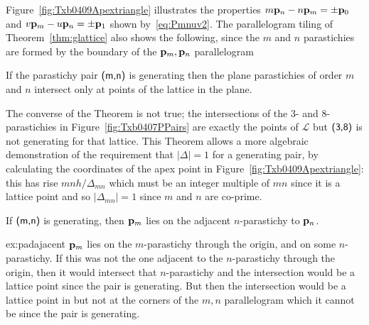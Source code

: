 Figure~\ref{fig:Txb0409Apextriangle} illustrates the properties $m{\mathbf p}_{n}-n{\mathbf p}_{m}=\pm{\mathbf p}_{0}$ and $v{\mathbf p}_{m}-u{\mathbf p}_{n}=\pm{\mathbf p}_{1}$ shown by~\eqref{eq:Pmnuv2}.
%
%
%
The parallelogram tiling of Theorem~\ref{thm:glattice} also shows the following, since the $m$ and $n$ parastichies are formed by the boundary of the ${\mathbf p}_{m},{\mathbf p}_{n}$ parallelogram
\begin{theorem}
	\label{thm:planeintersect}
	If the parastichy pair $\textsf{(m,n)}$ is generating then the plane parastichies of order $m$ and $n$ intersect only at points of the lattice in the plane.
\end{theorem}
The converse of the Theorem is not true; the intersections of the 3- and 8-parastichies in  Figure~\ref{fig:Txb0407PPairs} are exactly the points of $\mathcal{L}$ but $\textsf{(3,8)}$ is not generating for that lattice. 
This Theorem allows a more algebraic demonstration of the requirement that $|\Delta|=1$ for a generating pair,  by calculating the coordinates of the apex point in Figure~\ref{fig:Txb0409Apextriangle}: this has rise $mnh/\Delta_{mn}$ which must be an integer multiple of $mn$ since it is a lattice point and so $|\Delta_{mn}|=1$ since $m$ and $n$ are co-prime.  

	
\begin{jExercise}\label{ex:padajacent}
	If $\textsf{(m,n)}$ is generating, then ${\mathbf p}_{m}$ lies on the adjacent $n$-parastichy to ${\mathbf p}_{n}$. 
\end{jExercise}
\begin{jAnswer}{ex:padajacent}{
	${\mathbf p}_{m}$ lies on the $m$-parastichy through the origin, and on some $n$-parastichy. If this was not the one adjacent to the $n$-parastichy through the origin, then it would intersect that $n$-parastichy and the intersection would be a lattice point since the pair is generating. But then the intersection would be a lattice point in but not at the corners of the $m,n$ parallelogram which it cannot be since the pair is generating. 
}\end{jAnswer}

